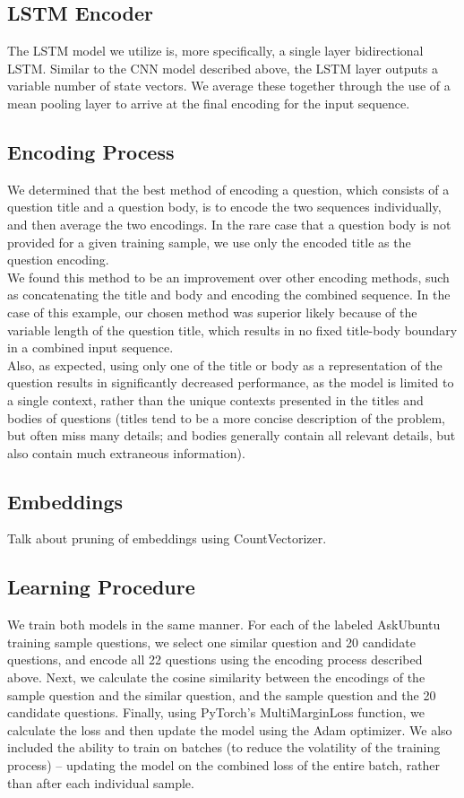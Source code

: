 \documentclass[12pt]{article}
\begin{document}
\subsection{LSTM Encoder}
The LSTM model we utilize is, more specifically, a single layer bidirectional LSTM. Similar to the CNN model described above, the LSTM layer outputs a variable number of state vectors. We average these together through the use of a mean pooling layer to arrive at the final encoding for the input sequence.

\subsection{Encoding Process}
We determined that the best method of encoding a question, which consists of a question title and a question body, is to encode the two sequences individually, and then average the two encodings. In the rare case that a question body is not provided for a given training sample, we use only the encoded title as the question encoding.\\

We found this method to be an improvement over other encoding methods, such as concatenating the title and body and encoding the combined sequence. In the case of this example, our chosen method was superior likely because of the variable length of the question title, which results in no fixed title-body boundary in a combined input sequence.\\

Also, as expected, using only one of the title or body as a representation of the question results in significantly decreased performance, as the model is limited to a single context, rather than the unique contexts presented in the titles and bodies of questions (titles tend to be a more concise description of the problem, but often miss many details; and bodies generally contain all relevant details, but also contain much extraneous information).

\subsection{Embeddings}
Talk about pruning of embeddings using CountVectorizer.

\subsection{Learning Procedure}
We train both models in the same manner. For each of the labeled AskUbuntu training sample questions, we select one similar question and 20 candidate questions, and encode all 22 questions using the encoding process described above. Next, we calculate the cosine similarity between the encodings of the sample question and the similar question, and the sample question and the 20 candidate questions. Finally, using PyTorch's MultiMarginLoss function, we calculate the loss and then update the model using the Adam optimizer. We also included the ability to train on batches (to reduce the volatility of the training process) -- updating the model on the combined loss of the entire batch, rather than after each individual sample.\\
\end{document}
